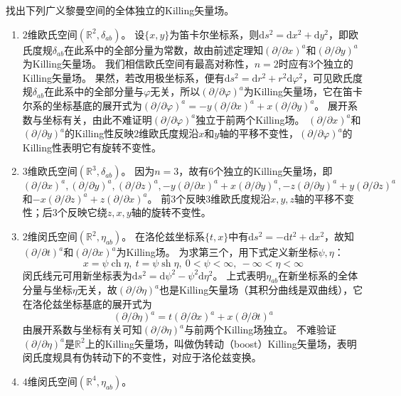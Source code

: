 \begin{example}
找出下列广义黎曼空间的全体独立的Killing矢量场。
\begin{enumerate}[（1）]
\item $2$维欧氏空间$(\mathbb{R}^2, \delta_{ab})$。
设$\{x, y\}$为笛卡尔坐标系，则$\mathrm{d}s^2 = \mathrm{d}x^2 + \mathrm{d}y^2$，即欧氏度规$\delta_{ab}$在此系中的全部分量为常数，故由前述定理知$(\partial / \partial x)^a$和$(\partial / \partial y)^a$为Killing矢量场。
我们相信欧氏空间有最高对称性，$n = 2$时应有$3$个独立的Killing矢量场。
果然，若改用极坐标系，便有$\mathrm{d}s^2 = \mathrm{d}r^2 + r^2\mathrm{d}\varphi^2$，可见欧氏度规$\delta_{ab}$在此系中的全部分量与$\varphi$无关，所以$(\partial / \partial \varphi)^a$为Killing矢量场，它在笛卡尔系的坐标基底的展开式为$(\partial / \partial \varphi)^a = -y(\partial / \partial x)^a + x(\partial / \partial y)^a$。
展开系数与坐标有关，由此不难证明$(\partial / \partial \varphi)^a$独立于前两个Killing场。
$(\partial / \partial x)^a$和$(\partial / \partial y)^a$的Killing性反映$2$维欧氏度规沿$x$和$y$轴的平移不变性，$(\partial / \partial \varphi)^a$的Killing性表明它有旋转不变性。
\item $3$维欧氏空间$(\mathbb{R}^3, \delta_{ab})$。
因为$n = 3$，故有$6$个独立的Killing矢量场，即$(\partial / \partial x)^a, (\partial / \partial y)^a, (\partial / \partial z)^a, -y(\partial / \partial x)^a + x(\partial / \partial y)^a, -z(\partial / \partial y)^a + y(\partial / \partial z)^a$和$-x(\partial / \partial z)^a + z(\partial / \partial x)^a$。
前$3$个反映$3$维欧氏度规沿$x, y, z$轴的平移不变性；后$3$个反映它绕$z, x, y$轴的旋转不变性。
\item $2$维闵氏空间$(\mathbb{R}^2, \eta_{ab})$。
在洛伦兹坐标系$\{t, x\}$中有$\mathrm{d}s^2 = -\mathrm{d}t^2 + \mathrm{d}x^2$，故知$(\partial / \partial t)^a$和$(\partial / \partial x)^a$为Killing场。
为求第三个，用下式定义新坐标$\psi, \eta$：
$$x = \psi\operatorname{ch}\eta, ~ t = \psi\operatorname{sh}\eta, ~ 0 < \psi < \infty, ~ -\infty < \eta < \infty$$
闵氏线元可用新坐标表为$\mathrm{d}s^2 = \mathrm{d}\psi^2 - \psi^2\mathrm{d}\eta^2$。
上式表明$\eta_{ab}$在新坐标系的全体分量与坐标$\eta$无关，故$(\partial / \partial \eta)^a$也是Killing矢量场（其积分曲线是双曲线），它在洛伦兹坐标基底的展开式为
$$(\partial / \partial \eta)^a = t(\partial / \partial x)^a + x(\partial / \partial t)^a$$
由展开系数与坐标有关可知$(\partial / \partial \eta)^a$与前两个Killing场独立。
不难验证$(\partial / \partial \eta)^a$是$\mathbb{R}^2$上的Killing矢量场，叫做伪转动（boost）Killing矢量场，表明闵氏度规具有伪转动下的不变性，对应于洛伦兹变换。
\item $4$维闵氏空间$(\mathbb{R}^4, \eta_{ab})$。

\end{enumerate}
\end{example}
